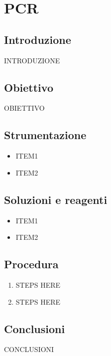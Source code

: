 \section {PCR}

\subsection{Introduzione}
INTRODUZIONE

\subsection{Obiettivo}
OBIETTIVO

\subsection{Strumentazione}
\begin{itemize}
  \item ITEM1
  \item ITEM2
\end{itemize}

\subsection{Soluzioni e reagenti}
\begin{itemize}
  \item ITEM1
  \item ITEM2
\end{itemize}

\newpage

\subsection{Procedura}
\begin{enumerate}
  \item STEPS HERE
  \item STEPS HERE
\end{enumerate}

\subsection{Conclusioni}

CONCLUSIONI
\newpage